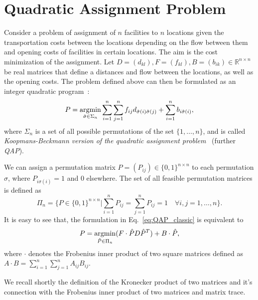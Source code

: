 \chapter{Quadratic Assignment Problem}\label{appendixA}
Consider a problem of assignment of $n$ facilities to $n$ locations given the transportation costs between the locations depending on the flow between them and opening costs of facilities in certain locations. The aim is the cost minimization of the assignment. Let $D=(d_{kl}),F=(f_{kl}), B=(b_{ik})\in\mathbb{R}^{n\times n}$ be real matrices that define a distances and flow between the locations, as well as the opening costs. The problem defined above can then be formulated as an integer quadratic program~\cite{Burkard98thequadratic,Koopman_Backman}:
\begin{equation}\label{eq:QAP_classic}
P = \mathop{\rm argmin}_{\hat{\sigma}\in\Sigma_n}\sum_{i=1}^{n}\sum_{j=1}^{n}f_{ij}d_{\hat{\sigma}(i)\hat{\sigma}(j)}+\sum_{i=1}^{n}b_{i\hat{\sigma}(i)},
\end{equation}
where $\Sigma_n$ is a set of all possible permutations of the set $\{1,\dots,n\}$, and is called \emph{Koopmans-Beckmann version of the quadratic assignment problem}~\cite{Burkard98thequadratic} (further \emph{QAP}). %


We can assign a permutation matrix $P=(P_{ij})\in\{0,1\}^{n\times n}$ to each permutation $\sigma$, where $P_{i\sigma(i)}=1$ and $0$ elsewhere. The set of all feasible permutation matrices is defined as
\begin{equation*}
\Pi_n=\{P\in\{0,1\}^{n\times n}|\sum_{i=1}^{n}P_{ij}=\sum_{j=1}^{n}P_{ij}=1\quad\forall i,j=1,\dots,n\}.
\end{equation*}
It is easy to see that, the formulation in Eq.~\eqref{eq:QAP_classic} %
is equivalent to
\begin{equation}\label{eq:QAP_classic2}
P = \mathop{\rm argmin}_{\hat{P}\in\Pi_n}(F\cdot \hat{P}D\hat{P}^T)+B\cdot\hat{P},
\end{equation}
where $\cdot$ denotes the Frobenius inner product of two square matrices defined as $A\cdot B=\sum_{i=1}^{n}\sum_{j=1}^{n}A_{ij}B_{ij}$.

We recall shortly the definition of the Kronecker product of two matrices and it's connection with the Frobenius inner product of two matrices and matrix trace.


